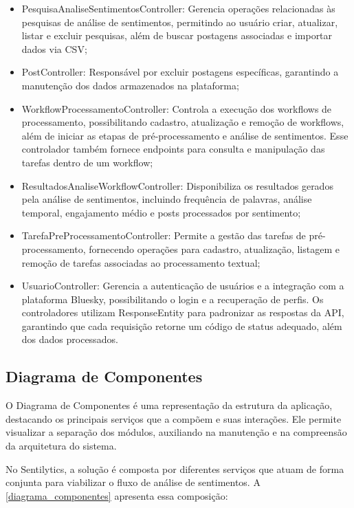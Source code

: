 \documentclass[
	12pt,				%
	oneside,			%
	a4paper,			%
	english,			%
	french,				%
	spanish,			%
	brazil				%
	]{abntex2}
\begin{document}
\begin{itemize}
\tightlist
\item
  PesquisaAnaliseSentimentosController: Gerencia operações relacionadas
  às pesquisas de análise de sentimentos, permitindo ao usuário criar,
  atualizar, listar e excluir pesquisas, além de buscar postagens
  associadas e importar dados via CSV;
\item
  PostController: Responsável por excluir postagens específicas,
  garantindo a manutenção dos dados armazenados na plataforma;
\item
  WorkflowProcessamentoController: Controla a execução dos workflows de
  processamento, possibilitando cadastro, atualização e remoção de
  workflows, além de iniciar as etapas de pré-processamento e análise de
  sentimentos. Esse controlador também fornece endpoints para consulta e
  manipulação das tarefas dentro de um workflow;
\item
  ResultadosAnaliseWorkflowController: Disponibiliza os resultados
  gerados pela análise de sentimentos, incluindo frequência de palavras,
  análise temporal, engajamento médio e posts processados por
  sentimento;
\item
  TarefaPreProcessamentoController: Permite a gestão das tarefas de
  pré-processamento, fornecendo operações para cadastro, atualização,
  listagem e remoção de tarefas associadas ao processamento textual;
\item
  UsuarioController: Gerencia a autenticação de usuários e a integração
  com a plataforma Bluesky, possibilitando o login e a recuperação de
  perfis. Os controladores utilizam ResponseEntity para padronizar as
  respostas da API, garantindo que cada requisição retorne um código de
  status adequado, além dos dados processados.
\end{itemize}

\hypertarget{diagrama-de-componentes}{%
\subsection{Diagrama de Componentes}\label{diagrama-de-componentes}}

O Diagrama de Componentes é uma representação da estrutura da aplicação,
destacando os principais serviços que a compõem e suas interações. Ele
permite visualizar a separação dos módulos, auxiliando na manutenção e
na compreensão da arquitetura do sistema.

No Sentilytics, a solução é composta por diferentes serviços que atuam
de forma conjunta para viabilizar o fluxo de análise de sentimentos. A
\autoref{diagrama_componentes} apresenta essa composição:
\end{document}
